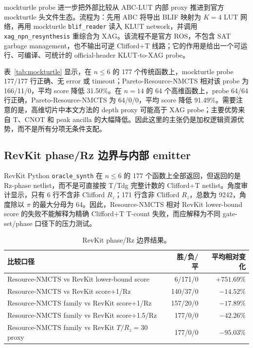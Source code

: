 \documentclass[UTF8,fontset=macnew,11pt]{ctexart}
\newcommand{\method}{Resource-NMCTS}
\newcommand{\rz}{\ensuremath{R_z}}
\begin{document}
mockturtle probe 进一步把外部比较从 ABC-LUT 内部 proxy 推进到官方 mockturtle 头文件生态。流程为：先用 ABC 将导出 BLIF 映射为 $K=4$ LUT 网络，再用 mockturtle \texttt{blif\_reader} 读入 KLUT network，并调用 \texttt{xag\_npn\_resynthesis} 重综合为 XAG。该流程不是官方 ROS，不包含 SAT garbage management，也不输出可逆 Clifford+T 线路；它的作用是给出一个可运行、可编译、可统计的 official-header KLUT-to-XAG probe。

\begin{table}[H]
\centering
\scriptsize
\caption{官方 mockturtle KLUT-to-XAG probe 对比。资源为 XAG AND/XOR/depth 派生的逻辑层 proxy，不是官方 ROS、可逆 garbage management 或硬件 mapping。}
\label{tab:mockturtle}


\vspace{0.8em}

\end{table}

表~\ref{tab:mockturtle} 显示，在 $n\leq6$ 的 177 个传统函数上，mockturtle probe 177/177 行正确、无 error 或 timeout；Pareto-\method{} 相对该 probe 为 166/11/0，平均 score 降低 31.50\%。在 $n=14$ 的 64 个高维函数上，probe 64/64 行正确，Pareto-\method{} 为 64/0/0，平均 score 降低 91.49\%。需要注意的是，高维切片中本文方法的 depth proxy 可能高于 XAG probe；主要优势来自 T、CNOT 和 peak ancilla 的大幅降低。因此这里的主张仍是加权逻辑资源优势，而不是所有分项无条件支配。

\subsection{RevKit phase/Rz 边界与内部 emitter}

RevKit Python \texttt{oracle\_synth} 在 $n\leq6$ 的 177 个函数上全部返回，但返回的是 Rz-phase netlist，而不是可直接按 T/Tdg 完整计数的 Clifford+T netlist。角度审计显示，只有 6 行不含非 Clifford \rz{}；171 行含非 Clifford \rz{}，总数为 9242，角度除以 $\pi$ 的最大分母为 64。因此，\method{} 相对 RevKit lower-bound score 的失败不能解释为精确 Clifford+T T-count 失败，而应解释为不同 gate-set/phase 口径下的压力测试。

\begin{table}[H]
\centering
\small
\caption{RevKit phase/Rz 边界结果。}
\label{tab:rz-boundary}
\begin{tabularx}{\linewidth}{>{\raggedright\arraybackslash}Xrr}
\toprule
比较口径 & 胜/负/平 & 平均相对变化 \\
\midrule
\method{} vs RevKit lower-bound score & 6/171/0 & $+751.69\%$ \\
\method{} vs RevKit score+1/Rz & 140/37/0 & $-14.52\%$ \\
Resource-NMCTS family vs RevKit score+1/Rz & 157/20/0 & $-17.89\%$ \\
Resource-NMCTS family vs RevKit score+1.5/Rz & 177/0/0 & $-42.26\%$ \\
Resource-NMCTS family vs RevKit $T/R_z=30$ proxy & 177/0/0 & $-95.03\%$ \\
\bottomrule
\end{tabularx}
\end{table}
\end{document}
